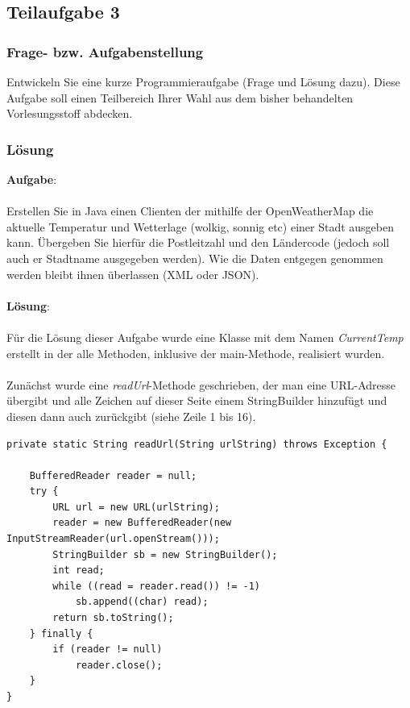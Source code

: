 \subsection{Teilaufgabe 3}

\subsubsection{Frage- bzw. Aufgabenstellung}
Entwickeln Sie eine kurze Programmieraufgabe (Frage und Lösung dazu). Diese Aufgabe soll einen Teilbereich Ihrer Wahl aus dem bisher behandelten Vorlesungsstoff abdecken.

\subsubsection{Lösung}

\textbf{Aufgabe}: \\
\\ 
Erstellen Sie in Java einen Clienten der mithilfe der OpenWeatherMap die aktuelle Temperatur und Wetterlage (wolkig, sonnig etc) einer Stadt ausgeben kann. Übergeben Sie hierfür die Postleitzahl und den Ländercode (jedoch soll auch er Stadtname ausgegeben werden). Wie die Daten entgegen genommen werden bleibt ihnen überlassen (XML oder JSON).  \\
\\
\textbf{Lösung}: \\
\\
Für die Lösung dieser Aufgabe wurde eine Klasse mit dem Namen \textit{CurrentTemp} erstellt in der alle Methoden, inklusive der main-Methode, realisiert wurden. \\
\\
Zunächst wurde eine \textit{readUrl}-Methode geschrieben, der man eine URL-Adresse übergibt und alle Zeichen auf dieser Seite einem StringBuilder hinzufügt und diesen dann auch zurückgibt (siehe Zeile 1 bis 16).

\begin{lstlisting}[caption={readUrl-Methode}]
private static String readUrl(String urlString) throws Exception {

	BufferedReader reader = null;
	try {
		URL url = new URL(urlString);
		reader = new BufferedReader(new InputStreamReader(url.openStream()));
		StringBuilder sb = new StringBuilder();
		int read;
		while ((read = reader.read()) != -1)
			sb.append((char) read);
		return sb.toString();
	} finally {
		if (reader != null)
			reader.close();
	}
}
\end{lstlisting}

